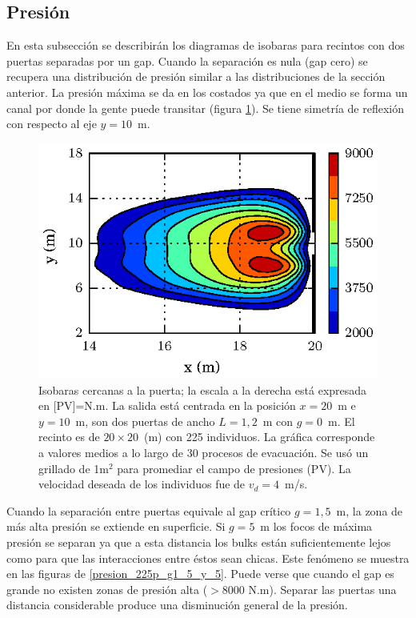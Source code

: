 \subsection{Presión}

En esta subsección se describirán los diagramas de isobaras para recintos con dos puertas separadas por un gap. 
Cuando la separación es nula (gap cero) se recupera una distribución de presión similar a las distribuciones de la sección anterior. La presión máxima se da en los costados ya que en el medio se forma un canal por donde la gente puede transitar (figura \ref{presion_225p_g0}). Se tiene simetría de reflexión con respecto al eje $y=10$~m. 
\begin{figure}[H]
    \centering
    \includegraphics[scale=1.5]{figuras/press_225p_v4_g0.eps}
    \caption[width=5cm]{Isobaras cercanas a la puerta; la escala a la derecha está expresada en [PV]=N.m. La salida está centrada en la posición $x=20$~m e $y=10$~m, son dos puertas de ancho $L=1,2$~m con $g=0$~m. El recinto es de $20\times 20$~(m) con 225 individuos. La gráfica corresponde a valores medios a lo largo de 30 procesos de evacuación. Se usó un grillado de 1m$^2$ para promediar el campo de presiones (PV). La velocidad deseada de los individuos fue de $v_d=4$~m/s.}
    \label{presion_225p_g0}
\end{figure}

Cuando la separación entre puertas equivale al gap crítico $g=1,5$~m, la zona de más alta presión se extiende en superficie. Si $g=5$~m los focos de máxima presión se separan ya que a esta distancia los bulks están suficientemente lejos como para que las interacciones entre éstos sean chicas. Este fenómeno se muestra en las figuras de \ref{presion_225p_g1_5_y_5}. Puede verse que cuando el gap es grande no existen zonas de presión alta ($>$8000 N.m). Separar las puertas una distancia considerable produce una disminución general de la presión.    

